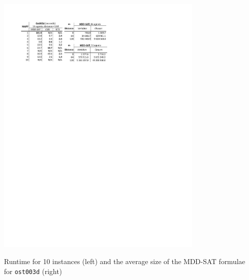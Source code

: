 \documentclass[jair,oneside,11pt]{article}
\begin{document}
\begin{table}
\centering
\includegraphics[trim={2cm 21.4cm 9.7cm 2.1cm},clip,width=0.75\textwidth]{table_ost003.pdf}
\caption{Runtime for 10 instances (left) and the average size
of the MDD-SAT formulae for \texttt{ost003d} (right)}\label{table_ost003}
\end{table}
\end{document}
